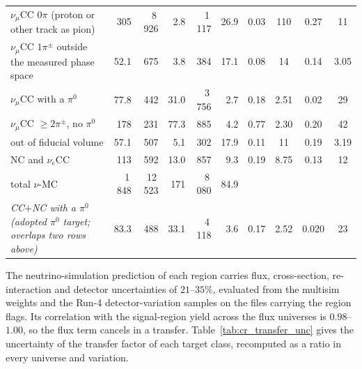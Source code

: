 \documentclass[11pt,a4paper]{article}
\begin{document}
\begin{table}[H]
\begin{tabular}{@{}p{4.2cm}rrrrrcccc@{}}
    $\nu_\mu$CC $0\pi$ (proton or other track as pion) & 305 & 8\,926 & 2.8 & 1\,117 & 26.9 & 0.03 & 110 & 0.27 & 11 \\
    $\nu_\mu$CC $1\pi^\pm$ outside the measured phase space & 52.1 & 675 & 3.8 & 384 & 17.1 & 0.08 & 14 & 0.14 & 3.05 \\
    $\nu_\mu$CC with a $\pi^0$ & 77.8 & 442 & 31.0 & 3\,756 & 2.7 & 0.18 & 2.51 & 0.02 & 29 \\
    $\nu_\mu$CC $\geq2\pi^\pm$, no $\pi^0$ & 178 & 231 & 77.3 & 885 & 4.2 & 0.77 & 2.30 & 0.20 & 42 \\
    out of fiducial volume & 57.1 & 507 & 5.1 & 302 & 17.9 & 0.11 & 11 & 0.19 & 3.19 \\
    NC and $\nu_e$CC & 113 & 592 & 13.0 & 857 & 9.3 & 0.19 & 8.75 & 0.13 & 12 \\
    total $\nu$-MC & 1\,848 & 12\,523 & 171 & 8\,080 & 84.9 & & & & \\
    \emph{CC$+$NC with a $\pi^0$ (adopted $\pi^0$ target; overlaps two rows above)} & 83.3 & 488 & 33.1 & 4\,118 & 3.6 & 0.17 & 2.52 & 0.020 & 23 \\
    \bottomrule
  \end{tabular}
\end{table}

The neutrino-simulation prediction of each region carries flux, cross-section, re-interaction and
detector uncertainties of $21$--$35\%$, evaluated from the multisim weights and the Run-4
detector-variation samples on the files carrying the region flags. Its correlation with the
signal-region yield across the flux universes is $0.98$--$1.00$, so the flux term cancels in a transfer.
Table~\ref{tab:cr_transfer_unc} gives the uncertainty of the transfer factor of each target class,
recomputed as a ratio in every universe and variation.
\end{document}
